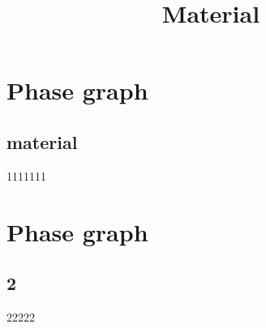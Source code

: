 \title{Material}



 \maketitle
\section{Phase graph}
\subsection{material} 1111111
\section{Phase graph}
\subsection{2} 22222
 